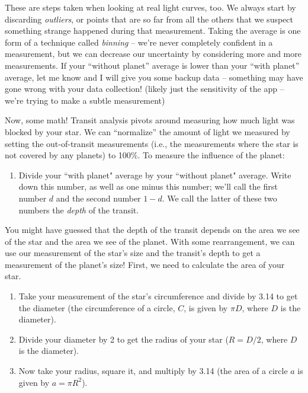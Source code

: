 \documentclass[11pt]{article}
\begin{document}
\noindent
These are steps taken when looking at real light curves, too. We always start by discarding \emph{outliers}, or points that are so far from all the others that we suspect something strange happened during that measurement. Taking the average is one form of a technique called \emph{binning} -- we’re never completely confident in a measurement, but we can decrease our uncertainty by considering more and more measurements. If your ``without planet” average is lower than your ``with planet” average, let me know and I will give you some backup data -- something may have gone wrong with your data collection! (likely just the sensitivity of the app -- we’re trying to make a subtle measurement)

\medskip \noindent
Now, some math! Transit analysis pivots around measuring how much light was blocked by your star. We can ``normalize” the amount of light we measured by setting the out-of-transit measurements (i.e., the measurements where the star is not covered by any planets) to 100\%. To measure the influence of the planet:
\begin{enumerate}[resume]
    \item Divide your ``with planet" average by your ``without planet" average. Write down this number, as well as one minus this number; we'll call the first number $d$ and the second number $1 - d$. We call the latter of these two numbers the \textit{depth} of the transit.
\end{enumerate}

\noindent
You might have guessed that the depth of the transit depends on the area we see of the star and the area we see of the planet. With some rearrangement, we can use our measurement of the star’s size and the transit’s depth to get a measurement of the planet’s size! First, we need to calculate the area of your star.

\begin{enumerate}[resume]
    \item Take your measurement of the star's circumference and divide by 3.14 to get the diameter (the circumference of a circle, $C$, is given by $\pi D$, where $D$ is the diameter). 
    
    \item Divide your diameter by 2 to get the radius of your star ($R = D/2$, where $D$ is the diameter).
    
    \item Now take your radius, square it, and multiply by 3.14 (the area of a circle $a$ is given by $a = \pi R^2$).
\end{enumerate}
\end{document}
